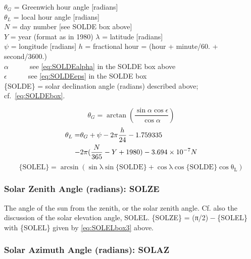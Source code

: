 \documentclass[
  english,
]{book}
\begin{document}
\(\theta_{G}\) = Greenwich hour angle
{[}radians{]}\\
\(\theta_{L}\) = local hour angle
{[}radians{]}\\
\(N\) = day number {[}see SOLDE box above{]}\\
\(Y\) = year (format as in 1980)
\(\lambda\) = latitude {[}radians{]}\\
\(\psi\) = longitude {[}radians{]}
\(h\) = fractional hour = (hour + minute/60. + second/3600.)\\
\(\alpha\)~~~~~~see \eqref{eq:SOLDEalpha} in the SOLDE box above\\
\(\epsilon\)~~~~~~see \eqref{eq:SOLDEeps} in the SOLDE box\\
\{SOLDE\} = solar declination angle (radians) described above; cf.~\eqref{eq:SOLDEbox}.

\begin{equation}
\theta_{G}=\arctan(\frac{\sin\alpha\cos\epsilon}{\cos\alpha})
\label{eq:SOLELbox1}
\end{equation}
\begin{align}
\theta_{L} = & \theta_{G}+\psi-2\pi\frac{h}{24}-1.759335\notag \\
 - &2\pi(\frac{N}{365}-Y+1980)-3.694\times10^{-7}N
\label{eq:SOLELbox2}
\end{align}
\begin{equation}
\mathrm{\mathrm{\{SOLEL\}}=\arcsin\left(\sin\lambda\sin\mathrm{\{SOLDE\}+\cos\lambda}\cos\mathrm{\{SOLDE\}}\cos\theta_{L}\right)}
\label{eq:SOLELbox3}
\end{equation}

\hypertarget{solze}{%
\subsubsection*{Solar Zenith Angle (radians): SOLZE}\label{solze}}

The angle of the sun from the zenith, or the solar zenith angle. Cf. also the discussion of the solar elevation angle, SOLEL. {\{SOLZE\} = (π/2) − \{SOLEL\}} with \{SOLEL\} given by \eqref{eq:SOLELbox3} above.

\hypertarget{solaz}{%
\subsubsection*{Solar Azimuth Angle (radians): SOLAZ}\label{solaz}}
\end{document}
